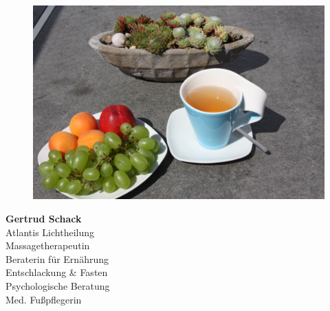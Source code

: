 \documentclass[10pt,foldmark,notumble]{leaflet}
\begin{document}
\vspace*{25mm}
\begin{figure}[h] %
\begin{center}
\includegraphics [scale=.055]{Bild_Fasten.JPG}
\end{center}
\end{figure}

\begin{center}
{\LARGE \bf {Gertrud Schack}}\\
\vspace*{5mm}
\large {Atlantis Lichtheilung} \\ %
\vspace*{1mm}
\large {Massagetherapeutin} \\ 
\vspace*{1mm}
\large {Beraterin für Ernährung } \\ %
\vspace*{1mm}
\large {Entschlackung \& Fasten} \\ 
\vspace*{1mm}
\large {Psychologische Beratung} \\ 
\vspace*{1mm}
\large {Med. Fußpflegerin} \\ 

\end{center}
\end{document}
